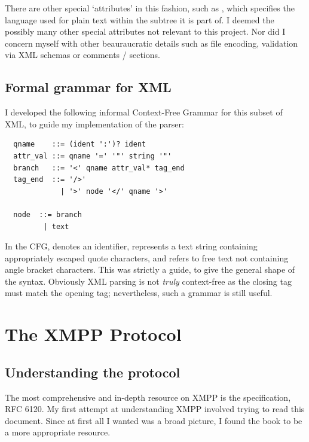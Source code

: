 \documentclass[12pt,a4paper,twoside,openright]{report}
\begin{document}
{There are other special `attributes' in this fashion, such as , which specifies the language used for plain text within the subtree it is part of. I deemed the possibly many other special attributes not relevant to this project. Nor did I concern myself with other beauraucratic details such as file encoding, validation via XML schemas or comments /  sections.

\subsection{Formal grammar for XML}
I developed the following informal Context-Free Grammar for this subset of XML, to guide my implementation of the parser:

\begin{minipage}{\linewidth}
  \begin{lstlisting}
  qname    ::= (ident ':')? ident
  attr_val ::= qname '=' '"' string '"'
  branch   ::= '<' qname attr_val* tag_end
  tag_end  ::= '/>'
             | '>' node '</' qname '>'

  node  ::= branch
         | text

  \end{lstlisting}
\end{minipage}

In the CFG,  denotes an identifier,  represents a text string containing appropriately escaped quote characters, and  refers to free text not containing angle bracket characters. This was strictly a guide, to give the general shape of the syntax. Obviously XML parsing is not \emph{truly} context-free as the closing tag must match the opening tag; nevertheless, such a grammar is still useful.

\section{The XMPP Protocol}

\subsection{Understanding the protocol}
The most comprehensive and in-depth resource on XMPP is the specification, RFC 6120. My first attempt at understanding XMPP involved trying to read this document. Since at first all I wanted was a broad picture, I found the book  to be a more appropriate resource.

}
\end{document}
